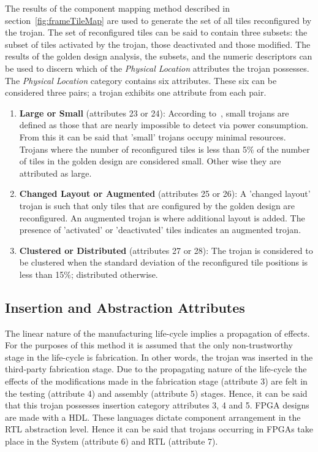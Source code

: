 \documentclass[conference]{IEEEtran}
\begin{document}
The results of the component mapping method described in section~\ref{fig:frameTileMap} are used to generate the set of all tiles reconfigured by the trojan.
The set of reconfigured tiles can be said to contain three subsets: the subset of tiles activated by the trojan, those deactivated and those modified. 
The results of the golden design analysis, the subsets, and the numeric descriptors can be used to discern which of the \textit{Physical Location} attributes the trojan possesses. 
The \textit{Physical Location} category contains six attributes.
These six can be considered three pairs; a trojan exhibits one attribute from each pair. 
\begin{enumerate}
	\item \textbf{Large or Small} (attributes 23 or 24): According to~\cite{samerAttribute}, small trojans are defined as those that are nearly impossible to detect via power consumption. From this it can be said that 'small' trojans occupy minimal resources. Trojans where the number of reconfigured tiles is less than 5\% of the number of tiles in the golden design are considered small. Other wise they are attributed as large.
	\item \textbf{Changed Layout or Augmented} (attributes 25 or 26): A 'changed layout' trojan is such that only tiles that are configured by the golden design are reconfigured. An augmented trojan is where additional layout is added. The presence of 'activated' or 'deactivated' tiles indicates an augmented trojan. 
	\item \textbf{Clustered or Distributed} (attributes 27 or 28): The trojan is considered to be clustered when the standard deviation of the reconfigured tile positions is less than 15\%; distributed otherwise.
\end{enumerate}
\subsection{Insertion and Abstraction Attributes}
The linear nature of the manufacturing life-cycle implies a propagation of effects.
For the purposes of this method it is assumed that the only non-trustworthy stage in the life-cycle is fabrication.
In other words, the trojan was inserted in the third-party fabrication stage.
Due to the propagating nature of the life-cycle the effects of the modifications made in the fabrication stage (attribute 3) are felt in the testing (attribute 4) and assembly (attribute 5) stages.
Hence, it can be said that this trojan possesses insertion category attributes 3, 4 and 5.
\acrshort{FPGA} designs are made with a \acrshort{HDL}.
These languages dictate component arrangement in the \acrfull{RTL} abstraction level.
Hence it can be said that trojans occurring in \acrshort{FPGAs} take place in the System (attribute 6) and \acrshort{RTL} (attribute 7).
  
\end{document}
